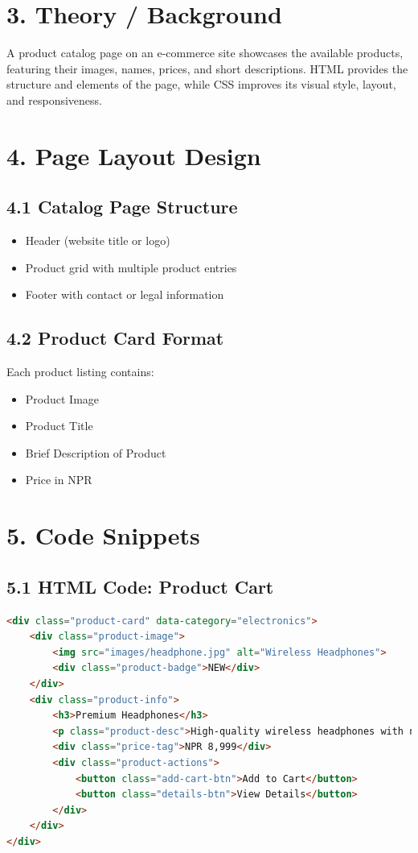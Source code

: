\documentclass[a4paper,12pt]{article}
\begin{document}
\section*{3. Theory / Background}
A product catalog page on an e-commerce site showcases the available products, featuring their images, names, prices, and short descriptions. HTML provides the structure and elements of the page, while CSS improves its visual style, layout, and responsiveness.

\section*{4. Page Layout Design}
\subsection*{4.1 Catalog Page Structure}
\begin{itemize}
  \item Header (website title or logo)
  \item Product grid with multiple product entries
  \item Footer with contact or legal information
\end{itemize}

\subsection*{4.2 Product Card Format}
Each product listing contains:
\begin{itemize}
  \item Product Image
  \item Product Title
  \item Brief Description of Product
  \item Price in NPR
\end{itemize}

\section*{5. Code Snippets}
\subsection*{5.1 HTML Code: Product Cart }
\begin{lstlisting}[language=HTML]
<div class="product-card" data-category="electronics">
    <div class="product-image">
        <img src="images/headphone.jpg" alt="Wireless Headphones">
        <div class="product-badge">NEW</div>
    </div>
    <div class="product-info">
        <h3>Premium Headphones</h3>
        <p class="product-desc">High-quality wireless headphones with noise cancellation</p>
        <div class="price-tag">NPR 8,999</div>
        <div class="product-actions">
            <button class="add-cart-btn">Add to Cart</button>
            <button class="details-btn">View Details</button>
        </div>
    </div>
</div>

\end{lstlisting}
\end{document}
